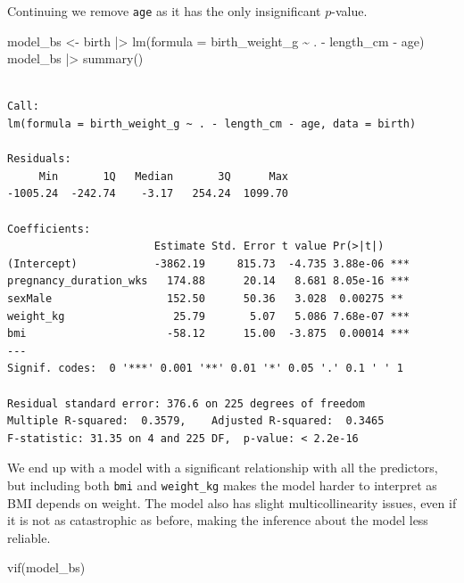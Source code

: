 \documentclass[
  letterpaper,
  DIV=11,
  numbers=noendperiod]{scrreprt}
\newenvironment{Shaded}{\begin{snugshade}}{\end{snugshade}}
\newcommand{\AttributeTok}[1]{\textcolor[rgb]{0.40,0.45,0.13}{#1}}
\newcommand{\FunctionTok}[1]{\textcolor[rgb]{0.28,0.35,0.67}{#1}}
\newcommand{\NormalTok}[1]{\textcolor[rgb]{0.00,0.23,0.31}{#1}}
\newcommand{\OtherTok}[1]{\textcolor[rgb]{0.00,0.23,0.31}{#1}}
\newcommand{\SpecialCharTok}[1]{\textcolor[rgb]{0.37,0.37,0.37}{#1}}
\begin{document}
Continuing we remove \texttt{age} as it has the only insignificant
\(p\)-value.

\begin{Shaded}
\begin{Highlighting}[]
\NormalTok{model\_bs }\OtherTok{\textless{}{-}}\NormalTok{ birth }\SpecialCharTok{|\textgreater{}} \FunctionTok{lm}\NormalTok{(}\AttributeTok{formula =}\NormalTok{ birth\_weight\_g }\SpecialCharTok{\textasciitilde{}}\NormalTok{ . }\SpecialCharTok{{-}}\NormalTok{ length\_cm }\SpecialCharTok{{-}}\NormalTok{ age)}
\NormalTok{model\_bs }\SpecialCharTok{|\textgreater{}} \FunctionTok{summary}\NormalTok{()}
\end{Highlighting}
\end{Shaded}

\begin{verbatim}

Call:
lm(formula = birth_weight_g ~ . - length_cm - age, data = birth)

Residuals:
     Min       1Q   Median       3Q      Max 
-1005.24  -242.74    -3.17   254.24  1099.70 

Coefficients:
                       Estimate Std. Error t value Pr(>|t|)    
(Intercept)            -3862.19     815.73  -4.735 3.88e-06 ***
pregnancy_duration_wks   174.88      20.14   8.681 8.05e-16 ***
sexMale                  152.50      50.36   3.028  0.00275 ** 
weight_kg                 25.79       5.07   5.086 7.68e-07 ***
bmi                      -58.12      15.00  -3.875  0.00014 ***
---
Signif. codes:  0 '***' 0.001 '**' 0.01 '*' 0.05 '.' 0.1 ' ' 1

Residual standard error: 376.6 on 225 degrees of freedom
Multiple R-squared:  0.3579,    Adjusted R-squared:  0.3465 
F-statistic: 31.35 on 4 and 225 DF,  p-value: < 2.2e-16
\end{verbatim}

We end up with a model with a significant relationship with all the
predictors, but including both \texttt{bmi} and \texttt{weight\_kg}
makes the model harder to interpret as BMI depends on weight. The model
also has slight multicollinearity issues, even if it is not as
catastrophic as before, making the inference about the model less
reliable.

\begin{Shaded}
\begin{Highlighting}[]
\FunctionTok{vif}\NormalTok{(model\_bs)}
\end{Highlighting}
\end{Shaded}
\end{document}
